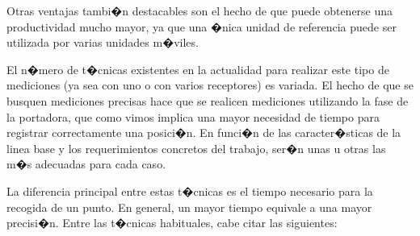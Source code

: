 Otras ventajas tambi�n destacables son el hecho de que puede obtenerse una productividad mucho mayor, ya que una �nica unidad de referencia puede ser utilizada por varias unidades m�viles.

El n�mero de t�cnicas existentes en la actualidad para realizar este tipo de mediciones (ya sea con uno o con varios receptores) es variada. El hecho de que se busquen mediciones precisas hace que se realicen mediciones utilizando la fase de la portadora, que como vimos implica una mayor necesidad de tiempo para registrar correctamente una posici�n. En funci�n de las caracter�sticas de la linea base y los requerimientos concretos del trabajo, ser�n unas u otras las m�s adecuadas para cada caso. 

La diferencia principal entre estas t�cnicas es el tiempo necesario para la recogida de un punto. En general, un mayor tiempo equivale a una mayor precisi�n. Entre las t�cnicas habituales, cabe citar las siguientes:

